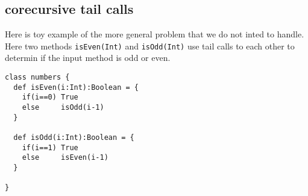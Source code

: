 \subsection{corecursive tail calls}
\label{sec:corecursionexample}

Here is toy example of the more general problem that we do not inted to handle. Here two methods \texttt{isEven(Int)} and \texttt{isOdd(Int)} use tail calls to each other to determin if the input method is odd or even.

\begin{lstlisting}
class numbers {
  def isEven(i:Int):Boolean = {
    if(i==0) True
    else     isOdd(i-1)
  }
  
  def isOdd(i:Int):Boolean = {
    if(i==1) True
    else     isEven(i-1)
  }
  
}
\end{lstlisting}

